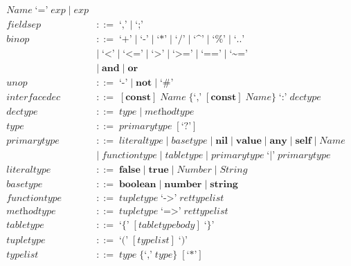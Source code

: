 \begin{align*}
  \textit{Name} \; \texttt{`='} \; \textit{exp} \; | \;
  \textit{exp}\\
\textit{fieldsep} & ::= \; \texttt{`,'} \; | \; \texttt{`;'}\\
\textit{binop} & ::= \; \texttt{`+'} \; | \; \texttt{`-'} \; | \; \texttt{`*'} \; | \; \texttt{`/'} \; | \;
  \texttt{`\textasciicircum'} \; | \; \texttt{`\%'} \; | \; \texttt{`..'}\\
& | \; \texttt{`<'} \; | \; \texttt{`<='} \; | \; \texttt{`>'} \; | \; \texttt{`>='} \; | \;
  \texttt{`=='} \; | \; \texttt{`\textasciitilde='}\\
& | \; \textbf{and} \; | \; \textbf{or}\\
\textit{unop} & ::= \; \texttt{`-'} \; | \; \textbf{not} \; | \; \texttt{`\#'}\\
\textit{interfacedec} & ::= \; [\textbf{const}] \; \textit{Name} \;
  \{\texttt{`,'} \; [\textbf{const}] \; \textit{Name}\} \; \texttt{`:'} \; \textit{dectype}\\
\textit{dectype} & ::= \; \textit{type} \; | \; \textit{methodtype}\\
\textit{type} & ::= \; \textit{primarytype} \; [\texttt{`?'}]\\
\textit{primarytype} & ::= \; \textit{literaltype} \; | \;
  \textit{basetype} \; | \;
  \textbf{nil} \; | \;
  \textbf{value} \; | \;
  \textbf{any} \; | \;
  \textbf{self} \; | \;
  \textit{Name}\\
& | \; \textit{functiontype} \; | \;
  \textit{tabletype} \; | \;
  \textit{primarytype} \; \texttt{`|'} \; \textit{primarytype}\\
\textit{literaltype} & ::= \; \textbf{false} \; | \;
  \textbf{true} \; | \;
  \textit{Number} \; | \;
  \textit{String}\\
\textit{basetype} & ::= \; \textbf{boolean} \; | \;
  \textbf{number} \; | \;
  \textbf{string}\\
\textit{functiontype} & ::= \; \textit{tupletype} \; \texttt{`->'} \; \textit{rettypelist}\\
\textit{methodtype} & ::= \; \textit{tupletype} \; \texttt{`=>'} \; \textit{rettypelist}\\
\textit{tabletype} & ::= \; \texttt{`\{'} \; [\textit{tabletypebody}] \; \texttt{`\}'}\\
\textit{tupletype} & ::= \; \texttt{`('} \; [typelist] \; \texttt{`)'}\\
\textit{typelist} & ::= \; \textit{type} \; \{\texttt{`,'} \; \textit{type}\} \; [\texttt{`*'}]\\

\end{align*}

